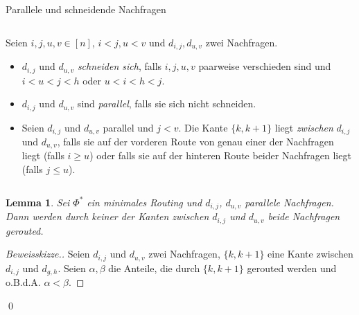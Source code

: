 \documentclass[8pt]{beamer}
\theoremstyle{claim}
\newtheorem{mylemma}[theorem]{Lemma}
\begin{document}
	\begin{frame}{Parallele und schneidende Nachfragen}
		\begin{columns}
		\begin{definition}
			Seien $i, j, u, v \in [n]$, $i < j, u < v$ und $d_{i,j}, d_{u, v}$ zwei Nachfragen.
			\begin{itemize}
				\item<1-> $d_{i, j}$ und $d_{u, v}$ \emph{schneiden sich}, falls $i, j, u, v$ paarweise verschieden sind und $i < u < j < h$ oder $u < i < h < j$.
				\item<2-> $d_{i, j}$ und $d_{u, v}$ sind \emph{parallel}, falls sie sich nicht schneiden.
				\item<3-> Seien $d_{i, j}$ und $d_{u, v}$ parallel und $j < v$.
				Die Kante $\{k, k+1\}$ liegt \emph{zwischen} $d_{i,j}$ und $d_{u, v}$, falls sie auf der vorderen Route von genau einer der Nachfragen liegt (falls $i \geq u$) oder falls sie auf der hinteren Route beider Nachfragen liegt (falls $j \leq u$).
			\end{itemize}
		\end{definition}
		\end{columns}
	\end{frame}

	\begin{frame}
		\begin{mylemma}
			Sei $\Phi^\ast$ ein minimales Routing und $d_{i, j}$, $d_{u, v}$ parallele Nachfragen.
			Dann werden durch keiner der Kanten zwischen $d_{i, j}$ und $d_{u, v}$ beide Nachfragen gerouted.
		\end{mylemma}
		\vspace{5mm}
		\begin{proof}[Beweisskizze.]\let\qed\relax
			Seien $d_{i, j}$ und $d_{u, v}$ zwei Nachfragen, $\{k, k+1\}$ eine Kante zwischen $d_{i, j}$ und $d_{g, h}$.
			Seien $\alpha, \beta$ die Anteile, die durch $\{k, k+1\}$ gerouted werden und o.B.d.A. $\alpha < \beta$.
		\end{proof}
		\begin{center}
			\begin{minipage}{0.4\linewidth}
					
			\end{minipage}
			\hspace{1.3cm}
			\begin{minipage}{0.4\linewidth}
				
			\end{minipage}	
		\end{center}
		\qed
	\end{frame}
\end{document}

